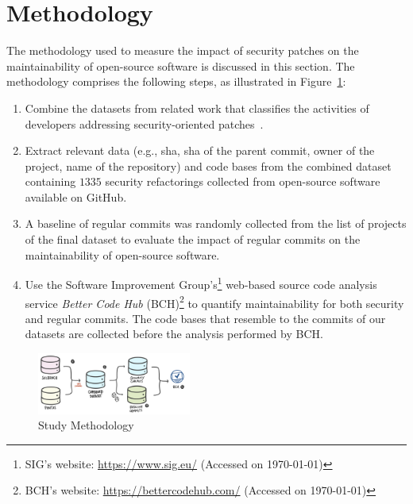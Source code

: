 \documentclass[10pt,conference]{IEEEtran}
\begin{document}
\section{Methodology}\label{sec:methodology}
%
The methodology used to measure the impact of security patches on the
maintainability of open-source software is discussed in this section.
The methodology comprises the following steps, as illustrated in
Figure~\ref{fig:met}:
%
\begin{enumerate}
	\item Combine the datasets from related work that classifies
the activities of developers addressing security-oriented patches~\cite{Reis:2017:IJSSE, 10.1109/MSR.2019.00064}.
%
	\item
	Extract relevant data (e.g., sha, sha of the parent commit, owner of the project, name of 
	the repository) and code bases from the combined dataset containing $1335$ security
	refactorings collected from open-source software available on
	GitHub.
%
	\item A baseline of regular commits was randomly collected from the list of
	projects of the final dataset to evaluate the impact of regular commits on the
	maintainability of open-source software.
%
  \item Use the Software Improvement Group's\footnote{SIG's website: \url{https://www.sig.eu/} 
  (Accessed on \today{})} web-based source code analysis
  service \emph{Better Code Hub} (BCH)\footnote{BCH's website:
  \url{https://bettercodehub.com/} (Accessed on \today{})} to quantify maintainability
  for both security and regular commits. The code bases that resemble to the commits
  of our datasets are collected before the analysis performed by BCH.
\end{enumerate}
%
\begin{figure}[h]
 	\centering 	\includegraphics[width=0.45\textwidth]{figures/methodology.pdf}
 	\caption{Study Methodology}
	\label{fig:met}
\end{figure}
%
\end{document}
